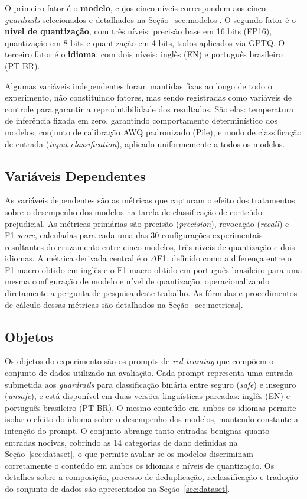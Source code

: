 O primeiro fator é o \textbf{modelo}, cujos cinco níveis correspondem aos cinco \textit{guardrails} selecionados e detalhados na Seção~\ref{sec:modelos}. O segundo fator é o \textbf{nível de quantização}, com três níveis: precisão base em 16 bits (FP16), quantização em 8 bits e quantização em 4 bits, todos aplicados via GPTQ. O terceiro fator é o \textbf{idioma}, com dois níveis: inglês (EN) e português brasileiro (PT-BR).

Algumas variáveis independentes foram mantidas fixas ao longo de todo o experimento, 
não constituindo fatores, mas sendo registradas como variáveis de controle para 
garantir a reprodutibilidade dos resultados. São elas: temperatura de inferência 
fixada em zero, garantindo comportamento determinístico dos modelos; conjunto de 
calibração AWQ padronizado (Pile); e modo de classificação de entrada 
(\textit{input classification}), aplicado uniformemente a todos os modelos.


\subsection{Variáveis Dependentes}
\label{sec:variaveis}

As variáveis dependentes são as métricas que capturam o efeito dos tratamentos sobre o desempenho dos modelos na tarefa de classificação de conteúdo prejudicial. As métricas primárias são precisão (\textit{precision}), revocação (\textit{recall}) e F1-\textit{score}, calculadas para cada uma das 30 configurações experimentais resultantes do cruzamento entre cinco modelos, três níveis de quantização e dois idiomas. A métrica derivada central é o $\Delta$F1, definido como a diferença entre o F1 macro obtido em inglês e o F1 macro obtido em português brasileiro para uma mesma configuração de modelo e nível de quantização, operacionalizando diretamente a pergunta de pesquisa deste trabalho. As fórmulas e procedimentos de cálculo dessas métricas são detalhados na Seção~\ref{sec:metricas}.

\subsection{Objetos}
\label{sec:objetos}
Os objetos do experimento são os prompts de \textit{red-teaming} que compõem o conjunto de dados utilizado na avaliação. Cada prompt representa uma entrada submetida aos \textit{guardrails} para classificação binária entre seguro (\textit{safe}) e inseguro (\textit{unsafe}), e está disponível em duas versões linguísticas pareadas: inglês (EN) e português brasileiro (PT-BR). O mesmo conteúdo em ambos os idiomas permite isolar o efeito do idioma sobre o desempenho dos modelos, mantendo constante a intenção do prompt. O conjunto abrange tanto entradas benignas quanto entradas nocivas, cobrindo as 14 categorias de dano definidas na Seção~\ref{sec:dataset}, o que permite avaliar se os modelos discriminam corretamente o conteúdo em ambos os idiomas e níveis de quantização. Os detalhes sobre a composição, processo de deduplicação, reclassificação e tradução do conjunto de dados são apresentados na Seção~\ref{sec:dataset}.

